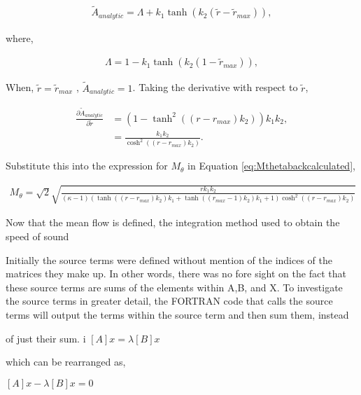 \begin{align*}
\widetilde{A}_{analytic} = \Lambda + k_1 \tanh \left( k_2 \left( \widetilde{r} - \widetilde{r}_{max} \right) \right),
\end{align*}

where, 

\begin{align*}
    \Lambda = 1 - k_1 \tanh(k_2 (1 - \widetilde{r}_{max})),
\end{align*}

When, $\widetilde{r}=\widetilde{r}_{max}$ , $\widetilde{A}_{analytic} = 1$.  
Taking the derivative with respect to $\widetilde{r}$,

\begin{align*}
    \frac{\partial \widetilde{A}_{analytic} }{\partial \widetilde{r}} &=
    \left(1 - \tanh^{2}{\left(\left(r - r_{max}\right) {k}_{2} \right)}\right) {k}_{1} {k}_{2}, \\ 
    &= \frac{ k_{1} k_{2}}{\cosh^{2}{\left(\left(r - r_{max}\right) {k}_{2} \right)}}.
\end{align*}

Substitute this into the expression for $M_{\theta}$ in Equation 
\ref{eq:Mthetabackcalculated},

\begin{align*}
    M_{\theta} = \sqrt{2}
    \sqrt{\frac{r {k}_{1} {k}_{2}}{\left(\kappa - 1\right) \left(\tanh{\left(\left(r - r_{max}\right) {k}_{2} \right)} {k}_{1} + \tanh{\left(\left(r_{max} - 1\right) {k}_{2} \right)} {k}_{1} + 1\right) \cosh^{2}{\left(\left(r - r_{max}\right) {k}_{2} \right)}}}
\end{align*} 

Now that the mean flow is defined, the integration method used to obtain the 
speed of sound


Initially the source terms were defined without mention of the indices of the 
matrices they make up. In other words, there was no fore sight on the fact that
these source terms are sums of the elements within A,B, and X. To investigate 
the source terms in greater detail, the FORTRAN code that calls the source 
terms will output the terms within the source term and then sum them, instead 


of just their sum.
i
$ [A]{x} = \lambda [B] {x} $

which can be rearranged as,

$ [A]{x} - \lambda [B] {x} = 0$

